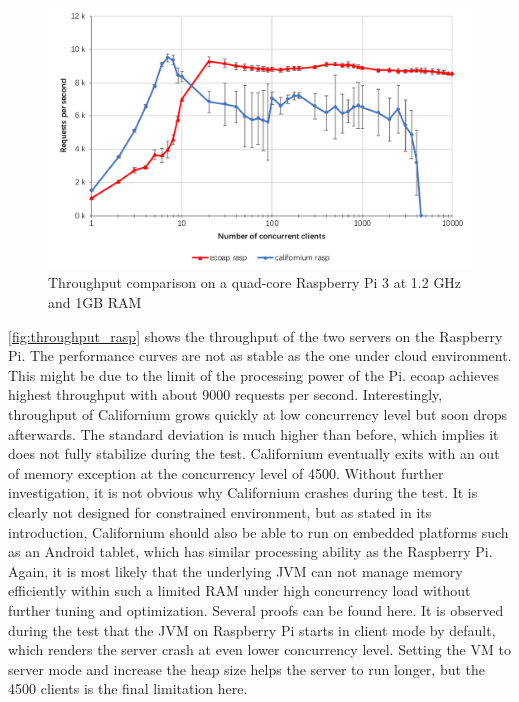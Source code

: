 \begin{figure}[!htbp]
\centering
\includegraphics[scale = 0.8]{throughput_rasp}
\caption{Throughput comparison on a quad-core Raspberry Pi 3 at 1.2 GHz and 1GB RAM}
\label{fig:throughput_rasp}
\end{figure}

\autoref{fig:throughput_rasp} shows the throughput of the two servers on the Raspberry Pi. The performance curves are not as stable as the one under cloud environment. This might be due to the limit of the processing power of the Pi. ecoap achieves highest throughput with about 9000 requests per second. Interestingly, throughput of Californium grows quickly at low concurrency level but soon drops afterwards. The standard deviation is much higher than before, which implies it does not fully stabilize during the test. Californium eventually exits with an out of memory exception at the concurrency level of 4500. Without further investigation, it is not obvious why Californium crashes during the test. It is clearly not designed for constrained environment, but as stated in its introduction, Californium should also be able to run on embedded platforms such as an Android tablet, which has similar processing ability as the Raspberry Pi. Again, it is most likely that the underlying JVM can not manage memory efficiently within such a limited RAM under high concurrency load without further tuning and optimization. Several proofs can be found here. It is observed during the test that the JVM on Raspberry Pi starts in client mode by default, which renders the server crash at even lower concurrency level. Setting the VM to server mode and increase the heap size helps the server to run longer, but the 4500 clients is the final limitation here. 

